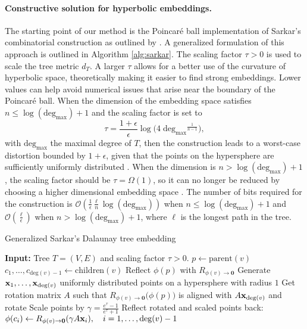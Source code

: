 \paragraph{Constructive solution for hyperbolic embeddings.}
The starting point of our method is the Poincaré ball implementation of Sarkar's combinatorial construction \citep{sarkar2011low} as outlined by \citep{sala2018representation}. A generalized formulation of this approach is outlined in Algorithm \ref{alg:sarkar}. The scaling factor $\tau > 0$ is used to scale the tree metric $d_T$. A larger $\tau$ allows for a better use of the curvature of hyperbolic space, theoretically making it easier to find strong embeddings. Lower values can help avoid numerical issues that arise near the boundary of the Poincaré ball. When the dimension of the embedding space satisfies $n \leq \log (\text{deg}_{\max}) + 1$ and the scaling factor is set to
\begin{equation}\label{eq:tau_nd}
    \tau = \frac{1 + \epsilon} {\epsilon} \log \Big( 4 \; \text{deg}_{\max}{}^{\frac{1}{n-1}} \Big),
\end{equation}
with $\text{deg}_{\max}$ the maximal degree of $T$, then the construction leads to a worst-case distortion bounded by $1 + \epsilon$, given that the points on the hypersphere are sufficiently uniformly distributed \citep{sala2018representation}. When the dimension is $n > \log (\text{deg}_{\max}) + 1$, the scaling factor should be $\tau = \Omega(1)$, so it can no longer be reduced by choosing a higher dimensional embedding space \citep{sala2018representation}. The number of bits required for the construction is $\mathcal{O}(\frac{1}{\epsilon} \frac{\ell}{n} \log (\text{deg}_{\max}))$ when $n \leq \log (\text{deg}_{\max}) + 1$ and $\mathcal{O} (\frac{\ell}{\epsilon})$ when $n > \log (\text{deg}_{\max}) + 1$, where $\ell$ is the longest path in the tree.


\begin{algorithm}[h]
    \caption{Generalized Sarkar's Dalaunay tree embedding}\label{alg:sarkar}
    \begin{algorithmic}[1]
        \STATE \textbf{Input:} Tree $T = (V, E)$ and scaling factor $\tau > 0$.
            \STATE $p \gets \text{parent}(v)$
            \STATE $c_1, \ldots, c_{\text{deg}(v) - 1} \gets \text{children}(v)$
            \STATE Reflect $\phi(p)$ with $R_{\phi(v) \rightarrow \mathbf{0}}$ 
            \STATE Generate $\mathbf{x}_1, \ldots, \mathbf{x}_{\text{deg}(v)}$ uniformly distributed points on a hypersphere with radius $1$ 
            \STATE Get rotation matrix $A$ such that $R_{\phi(v) \rightarrow \mathbf{0}} \big(\phi(p)\big)$ is aligned with $A \mathbf{x}_{\text{deg}(v)}$ and rotate
            \STATE Scale points by $\gamma = \frac{e^\tau - 1}{e^\tau + 1}$ 
            \STATE Reflect rotated and scaled points back: $\phi(c_i) \gets R_{\phi(v) \rightarrow \mathbf{0}} (\gamma A\mathbf{x}_i), \quad i = 1, \ldots, \text{deg}(v) - 1$ 
        \ENDFOR
    \end{algorithmic}
\end{algorithm}

